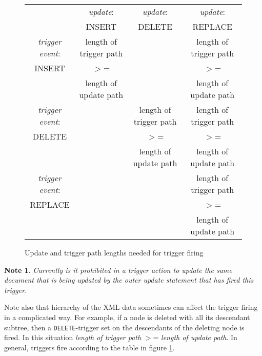 \documentclass[a4paper,12pt]{article}
\newtheorem{note}{Note}
\begin{document}
\begin{figure}[h]
\begin{center}
{\footnotesize\begin{tabular}{|c||c|c|c|}

\hline
   & \emph{update}:  & \emph{update}:  & \emph{update}:  \\
   & INSERT   & DELETE   & REPLACE  \\
\hline
\hline
\emph{trigger event}:  & length of trigger path &   &  length of trigger path   \\
     INSERT            &          $>$=          &   &          $>$=             \\
                       & length of update path  &   &  length of update path    \\


\hline

\emph{trigger event}:  &  & length of trigger path &  length of trigger path \\
      DELETE           &  &         $>$=           &          $>$=          \\
                       &  & length of update path  &  length of update path \\


\hline

\emph{trigger event}: &  &   &  length of trigger path \\
      REPLACE         &  &   &         $>$=            \\
                      &  &   &  length of update path  \\
\hline

\end{tabular}}
\caption{\label{triggertab} Update and trigger path lengths needed for trigger firing}
\end{center}
\end{figure}

\begin{note}
Currently is it prohibited in a trigger action to update the same document that is being updated by the outer update statement that has fired this trigger.
\end{note}


Note also that hierarchy of the XML data sometimes can affect the trigger firing in a complicated way. For example, if a node is deleted with all its descendant subtree, then a \verb!DELETE!-trigger set on the descendants of the deleting node is fired. In this situation \emph{length of trigger path} $>$= \emph{length of update path}.  In general, triggers fire according to the table in figure \ref{triggertab}.
\end{document}
